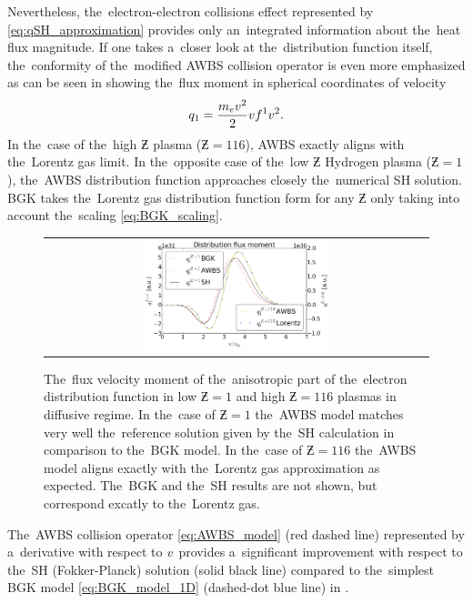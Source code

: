 Nevertheless, the~electron-electron collisions effect represented by 
\eqref{eq:qSH_approximation} provides only an~integrated information about
the~heat flux magnitude. If one takes a~closer look at the~distribution
function itself, the~conformity of the~modified AWBS collision operator
is even more emphasized as can be seen in  showing
the~flux moment in spherical coordinates of velocity
\begin{equation}
  q_1 = \frac{m_ev^2}{2}v f^1 v^2 .
  \label{eq:q1}
\end{equation}
In the~case of the~high $\Zbar$ plasma ($\Zbar = 116$), 
AWBS exactly aligns with the~Lorentz gas limit. In the~opposite case of the~low
$\Zbar$ Hydrogen plasma ($\Zbar = 1$), the~AWBS distribution function 
approaches closely the~numerical SH solution. BGK takes 
the~Lorentz gas distribution function form for any $\Zbar$ only taking into 
account the~scaling \eqref{eq:BGK_scaling}.  

\begin{figure}[tbh]
  \begin{center}
    \begin{tabular}{c}
      \includegraphics[width=0.5\textwidth]{q1s.png}
    \end{tabular}
  \caption{  
  The~flux velocity moment of the~anisotropic part of the~electron distribution 
  function in low $\Zbar=1$ and high $\Zbar=116$ plasmas in diffusive regime. 
  In the~case of $\Zbar = 1$ the~AWBS model matches very well 
  the~reference solution given by the~SH calculation \cite{SpitzerHarm_PR1953} 
  in comparison to the~BGK model. In the~case of $\Zbar = 116$ the~AWBS model
  aligns exactly with the~Lorentz gas approximation as expected. The~BGK and 
  the~SH results are not shown, but correspond excatly to the~Lorentz gas.}
  \label{fig:q1s_summary}
  \end{center} 
\end{figure}

The~AWBS collision operator \eqref{eq:AWBS_model} (red dashed line) represented
by a~derivative with respect to $v$ provides 
a~significant improvement with respect to the~SH (Fokker-Planck) solution
(solid black line) compared to the~simplest BGK model \eqref{eq:BGK_model_1D}
(dashed-dot blue line) in .

